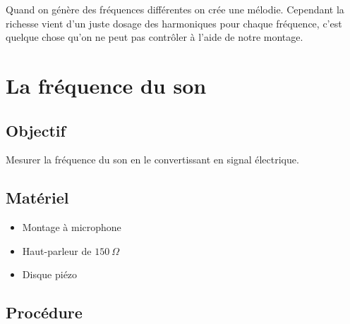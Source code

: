 \documentclass{book}
\begin{document}
Quand on génère des fréquences différentes on crée une mélodie. Cependant la richesse vient d'un juste dosage des harmoniques pour chaque fréquence, c'est quelque chose qu'on ne peut pas contrôler à l'aide de notre montage.







\section{La fréquence du son}


 \label{sec:Sound-Frequency}

\subsection{Objectif}


Mesurer la fréquence du son en le convertissant en signal électrique.




\subsection{Matériel}


\begin{itemize}
  \item Montage à microphone
  \item Haut-parleur de $150\ \Omega$
  \item Disque piézo
\end{itemize}

\subsection{Procédure}
\end{document}
